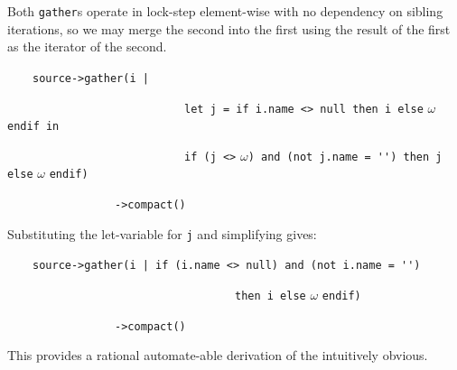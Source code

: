 \documentclass[
]{ceurart}
\begin{document}
Both \verb!gather!s operate in lock-step element-wise with no dependency on sibling iterations, so we may merge the second into the first using the result of the first as the iterator of the second.

\begin{description}[itemsep=-0.2cm]\small\begin{samepage}
\item ~~~~\verb!source->gather(i |!
\item ~~~~~~~~~~~~~~~~~~~~~~~~~~~~\verb!let j = if i.name <> null then i else! $\omega$ \verb!endif in!
\item ~~~~~~~~~~~~~~~~~~~~~~~~~~~~\verb!if (j <>! $\omega$\verb!) and (not j.name = '') then j else! $\omega$ \verb!endif)!
\item ~~~~~~~~~~~~~~~~~\verb!->compact()!
\end{samepage}\end{description}

Substituting the let-variable for \verb!j! and simplifying gives:

\begin{description}[itemsep=-0.2cm]\small\begin{samepage}
\item ~~~~\verb!source->gather(i | if (i.name <> null) and (not i.name = '')!
\item ~~~~~~~~~~~~~~~~~~~~~~~~~~~~~~~~~~~~\verb!then i else! $\omega$ \verb!endif)!
\item ~~~~~~~~~~~~~~~~~\verb!->compact()!
\end{samepage}\end{description}

This provides a rational automate-able derivation of the intuitively obvious. %


\end{document}
